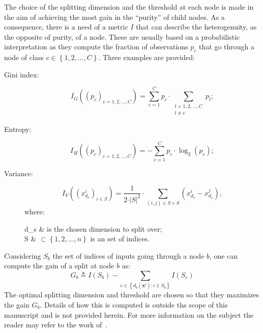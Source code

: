                 The choice of the splitting dimension and the threshold at each node is made in the aim of achieving the most gain in the ``purity'' of child nodes.
                As a consequence, there is a need of a metric $I$ that can describe the heterogenuity, as the opposite of purity, of a node.
                These are usually based on a probabilistic interpretation as they compute the fraction of observations $p_c$ that go through a node of class $c \in \left\{1, 2, \dots, C\right\}$.
                Three examples are provided:
                \begin{description}
                    \item[Gini index:]
                    \begin{equation}
                        \label{eq::gini}
                        I_G\left(\left(p_c\right)_{c=1, 2, \dots, C}\right) = \sum_{c=1}^{C} p_c \cdot \sum_{\substack{l=1, 2, \dots, C\\l \neq c}} p_l;
                    \end{equation}
                    \item[Entropy:]
                    \begin{equation}
                        \label{eq::entropy}
                        I_H\left(\left(p_c\right)_{c=1, 2, \dots, C}\right) = - \sum_{c=1}^{C} p_c \cdot \log_2(p_c);
                    \end{equation}
                    \item[Variance:]
                    \begin{equation}
                        \label{eq::variance_index}
                        I_V\left(\left(x_{d_s}^i\right)_{i\in S}\right) = \frac{1}{2 \cdot \vert S \vert^2} \cdot \sum_{(i,j) \in S\times S} \left(x_{d_s}^i - x_{d_s}^j\right),
                    \end{equation}
                    where:
                    \begin{conditions}
                        d_s & is the chosen dimension to split over;\\
                        S & $\subset \left\{1, 2, \dots, n\right\}$ is an set of indices.
                    \end{conditions}
                \end{description}
                Considering $S_b$ the set of indices of inputs going through a node $b$, one can compute the gain of a split at node $b$ as:
                \begin{equation}
                    \label{eq::split_gain}
                    G_b \triangleq I(S_b) - \sum_{c \in \left\{d_b(\bm{x}^i): i \in S_b\right\}} I(S_c)
                \end{equation}
                The optimal splitting dimension and threshold are chosen so that they maximizes the gain $G_b$.
                Details of how this is computed is outside ths scope of this manuscript and is not provided herein.
                For more information on the subject the reader may refer to the work of~\textcite{breiman1984classification}.\\

